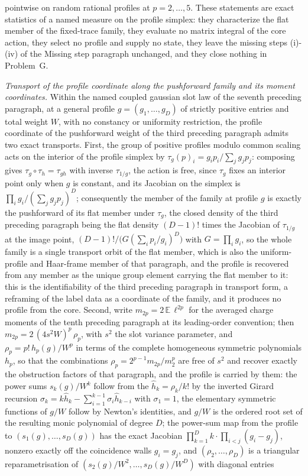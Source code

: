 pointwise on random rational profiles at \(p=2,\dots,5\). These statements are exact statistics of a named measure on the profile simplex: they characterize the flat member of the fixed-trace family, they evaluate no matrix integral of the core action, they select no profile and supply no state, they leave the missing steps (i)-(iv) of the Missing step paragraph unchanged, and they close nothing in Problem~G.

\emph{Transport of the profile coordinate along the pushforward family and its moment coordinates.} Within the named coupled gaussian slot law of the seventh preceding paragraph, at a general profile \(g=(g_{1},\dots,g_{D})\) of strictly positive entries and total weight \(W\), with no constancy or uniformity restriction, the profile coordinate of the pushforward weight of the third preceding paragraph admits two exact transports. First, the group of positive profiles modulo common scaling acts on the interior of the profile simplex by \(\tau_{g}(p)_{i}=g_{i}p_{i}/\sum_{j}g_{j}p_{j}\): composing gives \(\tau_{g}\circ\tau_{h}=\tau_{gh}\) with inverse \(\tau_{1/g}\), the action is free, since \(\tau_{g}\) fixes an interior point only when \(g\) is constant, and its Jacobian on the simplex is \(\prod_{i}g_{i}/(\sum_{j}g_{j}p_{j})^{D}\); consequently the member of the family at profile \(g\) is exactly the pushforward of its flat member under \(\tau_{g}\), the closed density of the third preceding paragraph being the flat density \((D-1)!\) times the Jacobian of \(\tau_{1/g}\) at the image point, \((D-1)!\big/\bigl(G(\sum_{i}p_{i}/g_{i})^{D}\bigr)\) with \(G=\prod_{i}g_{i}\), so the whole family is a single transport orbit of the flat member, which is also the uniform-profile and Haar-frame member of that paragraph, and the profile is recovered from any member as the unique group element carrying the flat member to it: this is the identifiability of the third preceding paragraph in transport form, a reframing of the label data as a coordinate of the family, and it produces no profile from the core. Second, write \(m_{2p}=2\,\mathbb{E}\,\ell^{2p}\) for the averaged charge moments of the tenth preceding paragraph at its leading-order convention; then \(m_{2p}=2\,(4s^{2}W)^{p}\,\rho_{p}\), with \(s^{2}\) the slot variance parameter, and \(\rho_{p}=p!\,h_{p}(g)/W^{p}\) in terms of the complete homogeneous symmetric polynomials \(h_{p}\), so that the combinations \(\rho_{p}=2^{p-1}m_{2p}/m_{2}^{p}\) are free of \(s^{2}\) and recover exactly the obstruction factors of that paragraph, and the profile is carried by them: the power sums \(s_{k}(g)/W^{k}\) follow from the \(\hat h_{k}=\rho_{k}/k!\) by the inverted Girard recursion \(\sigma_{k}=k\hat h_{k}-\sum_{i=1}^{k-1}\sigma_{i}\hat h_{k-i}\) with \(\sigma_{1}=1\), the elementary symmetric functions of \(g/W\) follow by Newton's identities, and \(g/W\) is the ordered root set of the resulting monic polynomial of degree \(D\); the power-sum map from the profile to \((s_{1}(g),\dots,s_{D}(g))\) has the exact Jacobian \(\prod_{k=1}^{D}k\cdot\prod_{i<j}(g_{i}-g_{j})\), nonzero exactly off the coincidence walls \(g_{i}=g_{j}\), and \((\rho_{2},\dots,\rho_{D})\) is a triangular reparametrisation of \((s_{2}(g)/W^{2},\dots,s_{D}(g)/W^{D})\) with diagonal entries 
